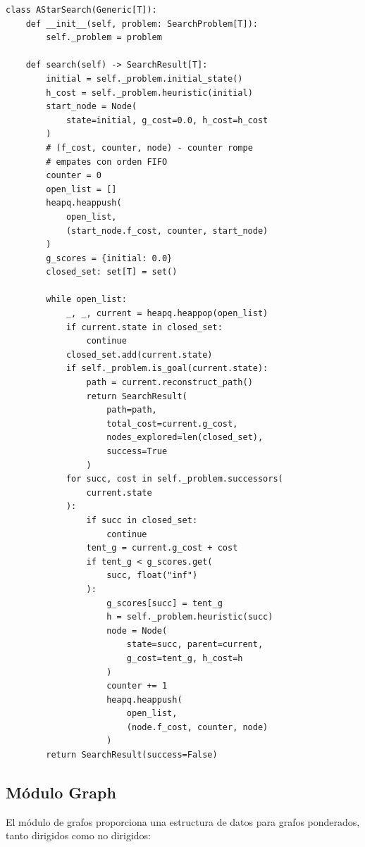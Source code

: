 \begin{lstlisting}[caption={Implementación del algoritmo A*}, label={lst:astar}]
class AStarSearch(Generic[T]):
    def __init__(self, problem: SearchProblem[T]):
        self._problem = problem

    def search(self) -> SearchResult[T]:
        initial = self._problem.initial_state()
        h_cost = self._problem.heuristic(initial)
        start_node = Node(
            state=initial, g_cost=0.0, h_cost=h_cost
        )
        # (f_cost, counter, node) - counter rompe
        # empates con orden FIFO
        counter = 0
        open_list = []
        heapq.heappush(
            open_list, 
            (start_node.f_cost, counter, start_node)
        )
        g_scores = {initial: 0.0}
        closed_set: set[T] = set()

        while open_list:
            _, _, current = heapq.heappop(open_list)
            if current.state in closed_set:
                continue
            closed_set.add(current.state)
            if self._problem.is_goal(current.state):
                path = current.reconstruct_path()
                return SearchResult(
                    path=path,
                    total_cost=current.g_cost,
                    nodes_explored=len(closed_set),
                    success=True
                )
            for succ, cost in self._problem.successors(
                current.state
            ):
                if succ in closed_set:
                    continue
                tent_g = current.g_cost + cost
                if tent_g < g_scores.get(
                    succ, float("inf")
                ):
                    g_scores[succ] = tent_g
                    h = self._problem.heuristic(succ)
                    node = Node(
                        state=succ, parent=current,
                        g_cost=tent_g, h_cost=h
                    )
                    counter += 1
                    heapq.heappush(
                        open_list,
                        (node.f_cost, counter, node)
                    )
        return SearchResult(success=False)
\end{lstlisting}

\subsection{Módulo Graph}

El módulo de grafos proporciona una estructura de datos para grafos ponderados, tanto dirigidos como no dirigidos:


